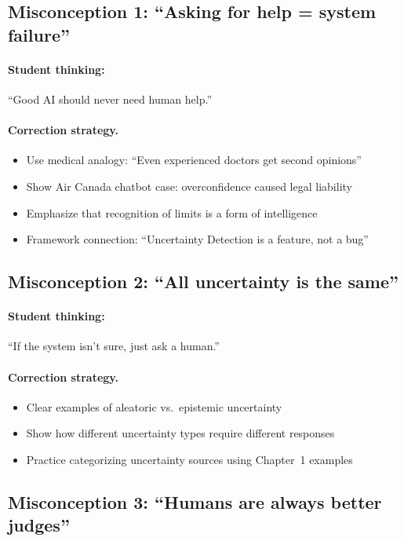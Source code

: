 \subsection{Misconception 1: ``Asking for help = system failure''}

\paragraph{Student thinking:} ``Good AI should never need human help.''

\paragraph{Correction strategy.}
\begin{itemize}
    \item Use medical analogy: ``Even experienced doctors get second opinions''
    \item Show Air Canada chatbot case: overconfidence caused legal liability
    \item Emphasize that recognition of limits is a form of intelligence
    \item Framework connection: ``Uncertainty Detection is a feature, not a bug''
\end{itemize}

\subsection{Misconception 2: ``All uncertainty is the same''}

\paragraph{Student thinking:} ``If the system isn't sure, just ask a human.''

\paragraph{Correction strategy.}
\begin{itemize}
    \item Clear examples of aleatoric vs.\ epistemic uncertainty
    \item Show how different uncertainty types require different responses
    \item Practice categorizing uncertainty sources using Chapter~1 examples
\end{itemize}

\subsection{Misconception 3: ``Humans are always better judges''}

